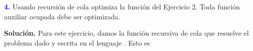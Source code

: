\newpage
\textbf{\textcolor{blue}{4.}} \Large
Usando recursión de cola optimiza la función del Ejercicio 2. Toda función auxiliar ocupada
debe ser optimizada.\newline

\textbf{Solución.} Para este ejercicio, damos la función recursiva de cola que resuelve
el problema dado y escrita en el lenguaje . Esto es


